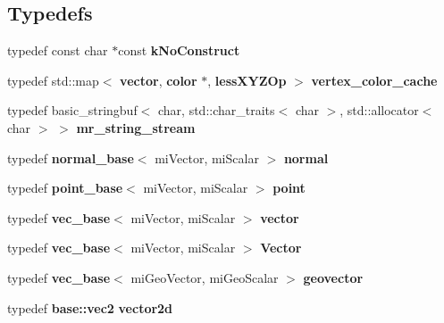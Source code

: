 \subsection*{Typedefs}
\begin{CompactItemize}
\item 
typedef const char $\ast$const  {\bf k\-No\-Construct}
\item 
typedef std::map$<$ {\bf vector}, {\bf color} $\ast$, {\bf less\-XYZOp} $>$ {\bf vertex\_\-color\_\-cache}
\item 
typedef basic\_\-stringbuf$<$ char, std::char\_\-traits$<$ char $>$, std::allocator$<$ char $>$ $>$ {\bf mr\_\-string\_\-stream}
\item 
typedef {\bf normal\_\-base}$<$ mi\-Vector, mi\-Scalar $>$ {\bf normal}
\item 
typedef {\bf point\_\-base}$<$ mi\-Vector, mi\-Scalar $>$ {\bf point}
\item 
typedef {\bf vec\_\-base}$<$ mi\-Vector, mi\-Scalar $>$ {\bf vector}
\item 
typedef {\bf vec\_\-base}$<$ mi\-Vector, mi\-Scalar $>$ {\bf Vector}
\item 
typedef {\bf vec\_\-base}$<$ mi\-Geo\-Vector, mi\-Geo\-Scalar $>$ {\bf geovector}
\item 
typedef {\bf base::vec2} {\bf vector2d}
\end{CompactItemize}
